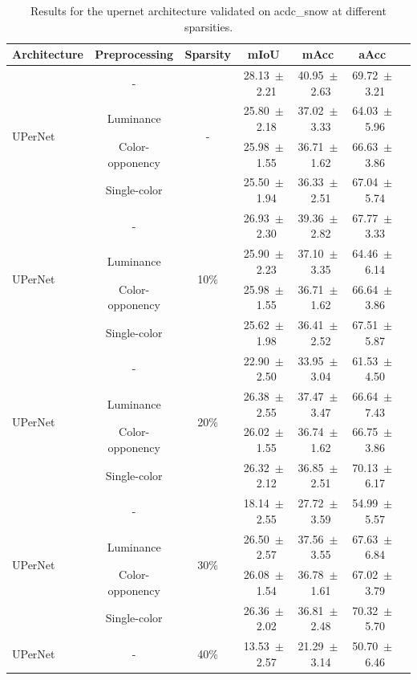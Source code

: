 \begin{table}[h]
\centering
\caption{Results for the upernet architecture validated on acdc_snow at different sparsities.}
\begin{tabular}{@{}lccc ccc@{}}
\toprule
Architecture & Preprocessing & Sparsity & mIoU & mAcc & aAcc \\
\midrule

\multirow{4}{*}{UPerNet} & - & \multirow{4}{*}{-} & 28.13~$\pm$~2.21 & 40.95~$\pm$~2.63 & 69.72~$\pm$~3.21 \\
& Luminance & & 25.80~$\pm$~2.18 & 37.02~$\pm$~3.33 & 64.03~$\pm$~5.96 \\
& Color-opponency & & 25.98~$\pm$~1.55 & 36.71~$\pm$~1.62 & 66.63~$\pm$~3.86 \\
& Single-color & & 25.50~$\pm$~1.94 & 36.33~$\pm$~2.51 & 67.04~$\pm$~5.74 \\
\midrule
\multirow{4}{*}{UPerNet} & - & \multirow{4}{*}{10\%} & 26.93~$\pm$~2.30 & 39.36~$\pm$~2.82 & 67.77~$\pm$~3.33 \\
& Luminance & & 25.90~$\pm$~2.23 & 37.10~$\pm$~3.35 & 64.46~$\pm$~6.14 \\
& Color-opponency & & 25.98~$\pm$~1.55 & 36.71~$\pm$~1.62 & 66.64~$\pm$~3.86 \\
& Single-color & & 25.62~$\pm$~1.98 & 36.41~$\pm$~2.52 & 67.51~$\pm$~5.87 \\
\midrule
\multirow{4}{*}{UPerNet} & - & \multirow{4}{*}{20\%} & 22.90~$\pm$~2.50 & 33.95~$\pm$~3.04 & 61.53~$\pm$~4.50 \\
& Luminance & & 26.38~$\pm$~2.55 & 37.47~$\pm$~3.47 & 66.64~$\pm$~7.43 \\
& Color-opponency & & 26.02~$\pm$~1.55 & 36.74~$\pm$~1.62 & 66.75~$\pm$~3.86 \\
& Single-color & & 26.32~$\pm$~2.12 & 36.85~$\pm$~2.51 & 70.13~$\pm$~6.17 \\
\midrule
\multirow{4}{*}{UPerNet} & - & \multirow{4}{*}{30\%} & 18.14~$\pm$~2.55 & 27.72~$\pm$~3.59 & 54.99~$\pm$~5.57 \\
& Luminance & & 26.50~$\pm$~2.57 & 37.56~$\pm$~3.55 & 67.63~$\pm$~6.84 \\
& Color-opponency & & 26.08~$\pm$~1.54 & 36.78~$\pm$~1.61 & 67.02~$\pm$~3.79 \\
& Single-color & & 26.36~$\pm$~2.02 & 36.81~$\pm$~2.48 & 70.32~$\pm$~5.70 \\
\midrule
\multirow{4}{*}{UPerNet} & - & \multirow{4}{*}{40\%} & 13.53~$\pm$~2.57 & 21.29~$\pm$~3.14 & 50.70~$\pm$~6.46 \\

\end{tabular}
\end{table}
